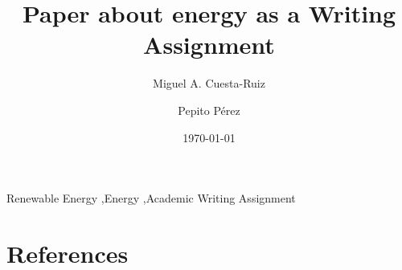 \documentclass[review]{elsarticle} %
\date{\today}
\begin{document}
\begin{frontmatter}

\title{Paper about energy as a Writing Assignment}

\author[label1]{Miguel A. Cuesta-Ruiz}
\author[label1, label2]{Pepito P\'erez}
\address[label1]{Facultad Ingenier\'\i{}a, Universidad de Deusto, Avda. Universidades, 24, 48007, Bilbao.}
\address[label2]{DeustoTech - Fundaci\'on Deusto, Avda Universidades, 24, 48007, Bilbao. }


\begin{keyword}
Renewable Energy \sep Energy \sep Academic Writing Assignment
\end{keyword}

\end{frontmatter}



\section*{References}

\end{document}
